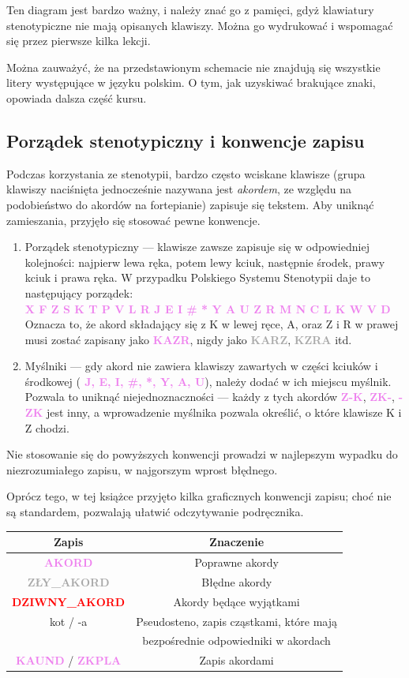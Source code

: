 \documentclass[12p, oneside]{book}
\newcommand{\steno}[1]{\textbf{\textsf{\textcolor{violet}{ #1}}}}
\newcommand{\stenoExc}[1]{\textbf{\textsf{\textcolor{red}{ #1}}}}
\newcommand{\stenoErr}[1]{\textbf{\textsf{\textcolor{darkgray}{ #1}}}}
\begin{document}
Ten diagram jest bardzo ważny, i należy znać go z pamięci, gdyż klawiatury stenotypiczne nie mają opisanych klawiszy. Można go wydrukować i wspomagać się przez pierwsze kilka lekcji.

Można zauważyć, że na przedstawionym schemacie nie znajdują się wszystkie litery występujące w języku polskim. O tym, jak uzyskiwać brakujące znaki, opowiada dalsza część kursu.

\subsection*{Porządek stenotypiczny i konwencje zapisu}
Podczas korzystania ze stenotypii, bardzo często wciskane klawisze (grupa klawiszy naciśnięta jednocześnie nazywana jest \emph{akordem}, ze względu na podobieństwo do akordów na fortepianie) zapisuje się tekstem. Aby uniknąć zamieszania, przyjęło się stosować pewne konwencje.
\begin{enumerate}
	\item Porządek stenotypiczny --- klawisze zawsze zapisuje się w odpowiedniej kolejności: najpierw lewa ręka, potem lewy kciuk, następnie środek, prawy kciuk i prawa ręka. W przypadku Polskiego Systemu Stenotypii daje to następujący porządek:\\
	\steno{X F Z S K T P V L R J E I \# * Y A U Z R M N C L K W V D}\\
	Oznacza to, że akord składający się z K w lewej ręce, A, oraz Z i R w prawej musi zostać zapisany jako \steno{KAZR}, nigdy jako \stenoErr{KARZ}, \stenoErr{KZRA} itd.
	\item Myślniki --- gdy akord nie zawiera klawiszy zawartych w części kciuków i środkowej (\steno{J, E, I, \#, *, Y, A, U}), należy dodać w ich miejscu myślnik. Pozwala to uniknąć niejednoznaczności --- każdy z tych akordów \steno{Z-K}, \steno{ZK-}, \steno{-ZK} jest inny, a wprowadzenie myślnika pozwala określić, o które klawisze K i Z chodzi.
\end{enumerate}
Nie stosowanie się do powyższych konwencji prowadzi w najlepszym wypadku do niezrozumiałego zapisu, w najgorszym wprost błędnego.

\newpage

Oprócz tego, w tej książce przyjęto kilka graficznych konwencji zapisu; choć nie są standardem, pozwalają ułatwić odczytywanie podręcznika.

\begin{tabular}{|c|c|}
	\hline
	Zapis & Znaczenie \\ \hline
	\steno{AKORD} & Poprawne akordy \\ \hline
	\stenoErr{ZŁY\_AKORD} & Błędne akordy \\ \hline
	\stenoExc{DZIWNY\_AKORD} & Akordy będące wyjątkami \\ \hline
	kot / -a & Pseudosteno, zapis cząstkami, które mają \\ & bezpośrednie odpowiedniki w akordach \\ \hline
	\steno{KAUND} / \steno{ZKPLA} & Zapis akordami \\ \hline
\end{tabular}
\end{document}
